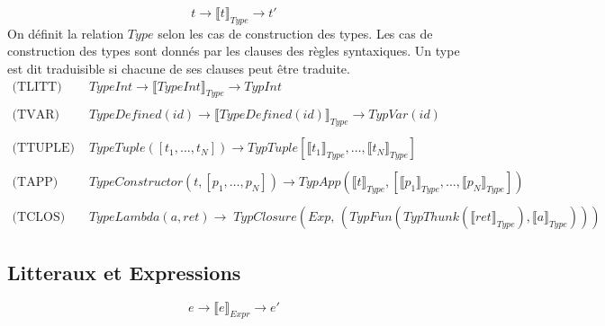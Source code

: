 \documentclass[
  12pt,
]{article}
\begin{document}
\[  t \rightarrow \llbracket t \rrbracket_{Type} \rightarrow t' \] On définit la relation
\({Type}\) selon les cas de construction des types. Les cas de
construction des types sont donnés par les clauses des règles
syntaxiques. Un type est dit traduisible si chacune de ses clauses peut
être traduite.
\begin{align*}
  \text{(TLITT) }  & TypeInt \rightarrow \llbracket TypeInt \rrbracket_{Type}  \rightarrow TypInt                                                                                       \\
  \\
  \text{(TVAR) }   & TypeDefined(id) \rightarrow \llbracket TypeDefined(id) \rrbracket_{Type} \rightarrow TypVar(id)                                                                    \\ \\
  \text{(TTUPLE) } & TypeTuple([t_1,\dots, t_N]) \rightarrow  TypTuple[\llbracket t_1 \rrbracket_{Type},\dots,\llbracket t_N \rrbracket_{Type}]                                         \\
  \\
  \text{(TAPP) }   & TypeConstructor(t, [p_1,\dots,p_N]) \rightarrow  TypApp(\llbracket t \rrbracket_{Type}, [\llbracket p_1 \rrbracket_{Type},\dots,\llbracket p_N \rrbracket_{Type}]) \\
  \\
  \text{(TCLOS) }  & TypeLambda(a,ret)
  \rightarrow \;               TypClosure(Exp, \, (TypFun(TypThunk(\llbracket ret \rrbracket_{Type}), \llbracket a \rrbracket_{Type})))
\end{align*}
\subsection{Litteraux et Expressions}\label{litteraux-et-expressions}

\[ e \rightarrow \llbracket e \rrbracket_{Expr} \rightarrow e'  \]
\end{document}
